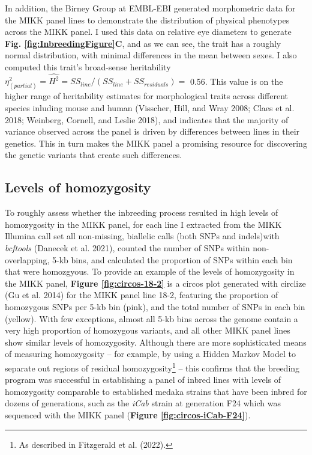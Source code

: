\documentclass[
]{book}
\begin{document}
In addition, the Birney Group at EMBL-EBI generated morphometric data for the MIKK panel lines to demonstrate the distribution of physical phenotypes across the MIKK panel. I used this data on relative eye diameters to generate \textbf{Fig. \ref{fig:InbreedingFigure}C}, and as we can see, the trait has a roughly normal distribution, with minimal differences in the mean between sexes. I also computed this trait's broad-sense heritability \(\eta^2_{(partial)} = \hat{H^2} = SS_{line} / (SS_{line} + SS_{residuals}) =\) 0.56. This value is on the higher range of heritability estimates for morphological traits across different species inluding mouse and human (Visscher, Hill, and Wray 2008; Claes et al. 2018; Weinberg, Cornell, and Leslie 2018), and indicates that the majority of variance observed across the panel is driven by differences between lines in their genetics. This in turn makes the MIKK panel a promising resource for discovering the genetic variants that create such differences.

\hypertarget{levels-of-homozygosity}{%
\subsection{Levels of homozygosity}\label{levels-of-homozygosity}}

To roughly assess whether the inbreeding process resulted in high levels of homozygosity in the MIKK panel, for each line I extracted from the MIKK Illumina call set all non-missing, biallelic calls (both SNPs and indels)with \emph{bcftools} (Danecek et al. 2021), counted the number of SNPs within non-overlapping, 5-kb bins, and calculated the proportion of SNPs within each bin that were homozgyous. To provide an example of the levels of homozygosity in the MIKK panel, \textbf{Figure \ref{fig:circos-18-2}} is a circos plot generated with circlize (Gu et al. 2014) for the MIKK panel line 18-2, featuring the proportion of homozygous SNPs per 5-kb bin (pink), and the total number of SNPs in each bin (yellow). With few exceptions, almost all 5-kb bins across the genome contain a very high proportion of homozygous variants, and all other MIKK panel lines show similar levels of homozygosity. Although there are more sophisticated means of measuring homozygosity -- for example, by using a Hidden Markov Model to separate out regions of residual homozygosity\footnote{As described in Fitzgerald et al. (2022).} -- this confirms that the breeding program was successful in establishing a panel of inbred lines with levels of homozygosity comparable to established medaka strains that have been inbred for dozens of generations, such as the \emph{iCab} strain at generation F24 which was sequenced with the MIKK panel (\textbf{Figure \ref{fig:circos-iCab-F24}}).
\end{document}
